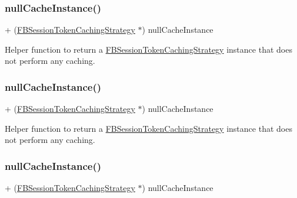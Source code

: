 \subsubsection{\texorpdfstring{null\+Cache\+Instance()}{nullCacheInstance()}\hspace{0.1cm}{\footnotesize\ttfamily [2/5]}}
{\footnotesize\ttfamily + (\hyperlink{interfaceFBSessionTokenCachingStrategy}{F\+B\+Session\+Token\+Caching\+Strategy} $\ast$) null\+Cache\+Instance \begin{DoxyParamCaption}{ }\end{DoxyParamCaption}}

Helper function to return a \hyperlink{interfaceFBSessionTokenCachingStrategy}{F\+B\+Session\+Token\+Caching\+Strategy} instance that does not perform any caching. \mbox{\label{interfaceFBSessionTokenCachingStrategy_a97f1da9c8423d4e6bbca2241bd894032}} 
\subsubsection{\texorpdfstring{null\+Cache\+Instance()}{nullCacheInstance()}\hspace{0.1cm}{\footnotesize\ttfamily [3/5]}}
{\footnotesize\ttfamily + (\hyperlink{interfaceFBSessionTokenCachingStrategy}{F\+B\+Session\+Token\+Caching\+Strategy} $\ast$) null\+Cache\+Instance \begin{DoxyParamCaption}{ }\end{DoxyParamCaption}}

Helper function to return a \hyperlink{interfaceFBSessionTokenCachingStrategy}{F\+B\+Session\+Token\+Caching\+Strategy} instance that does not perform any caching. \mbox{\label{interfaceFBSessionTokenCachingStrategy_a97f1da9c8423d4e6bbca2241bd894032}} 
\subsubsection{\texorpdfstring{null\+Cache\+Instance()}{nullCacheInstance()}\hspace{0.1cm}{\footnotesize\ttfamily [4/5]}}
{\footnotesize\ttfamily + (\hyperlink{interfaceFBSessionTokenCachingStrategy}{F\+B\+Session\+Token\+Caching\+Strategy} $\ast$) null\+Cache\+Instance \begin{DoxyParamCaption}{ }\end{DoxyParamCaption}}

